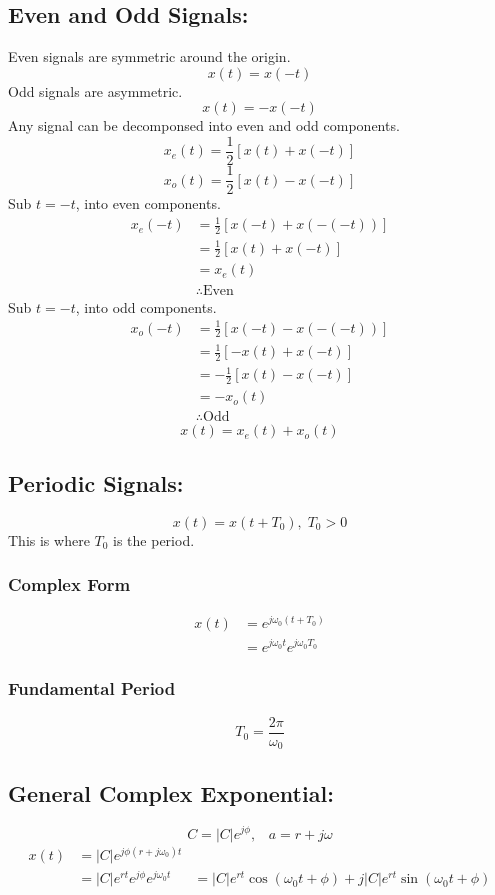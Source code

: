 \documentclass[a5paper]{article}
\begin{document}
	\subsection{Even and Odd Signals:}
	Even signals are symmetric around the origin.
	$$x(t)=x(-t)$$
	Odd signals are asymmetric.
	$$x(t)=-x(-t)$$
	Any signal can be decomponsed into even and odd components.
	$$x_{e}(t)=\frac{1}{2}[x(t)+x(-t)]$$
	$$x_{o}(t)=\frac{1}{2}[x(t)-x(-t)]$$
	Sub $t=-t$, into even components.
	\begin{align*}
		x_{e}(-t)&=\frac{1}{2}[x(-t)+x(-(-t))]\\
		&=\frac{1}{2}[x(t)+x(-t)]\\
		&=x_{e}(t)\\
		&\therefore\text{Even}
	\end{align*}
	Sub $t=-t$, into odd components.
	\begin{align*}
		x_{o}(-t)&=\frac{1}{2}[x(-t)-x(-(-t))]\\
		&=\frac{1}{2}[-x(t)+x(-t)]\\
		&=-\frac{1}{2}[x(t)-x(-t)]\\
		&=-x_{o}(t)\\
		&\therefore\text{Odd}
	\end{align*}
	$$x(t)=x_{e}(t)+x_{o}(t)$$
	\subsection{Periodic Signals:}
	$$x(t)=x(t+T_{0}),\;T_{0}>0$$
	This is where $T_{0}$ is the period.
	\subsubsection{Complex Form}
	\begin{align*}
		x(t)&=e^{j\omega_{0}(t+T_{0})}\\
		&=e^{j\omega_{0}t}e^{j\omega_{0}T_{0}}
	\end{align*}
	\subsubsection{Fundamental Period}
	$$T_{0}=\frac{2\pi}{\omega_{0}}$$
	\subsection{General Complex Exponential:}
	$$C=|C|e^{j\phi},\;\;\;a=r+j\omega$$
	\begin{align*}
		x(t)&=|C|e^{j\phi(r+j\omega_{0})t}\\
		&=|C|e^{rt}e^{j\phi}e^{j\omega_{0}t}
		&=|C|e^{rt}\cos{(\omega_{0}t+\phi)}+j|C|e^{rt}\sin{(\omega_{0}t+\phi)}
	\end{align*}
\end{document}
